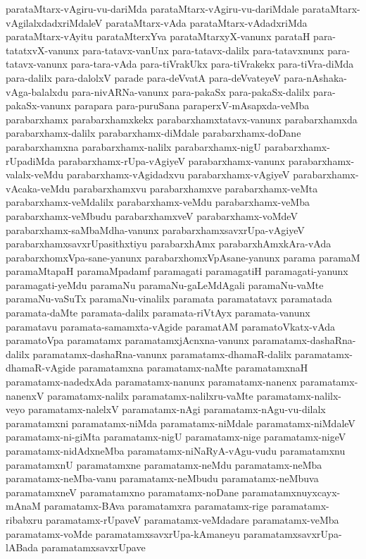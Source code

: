 {parataMtarx-vAgiru-vu-dariMda
parataMtarx-vAgiru-vu-dariMdale
parataMtarx-vAgilalxdadxriMdaleV
parataMtarx-vAda
parataMtarx-vAdadxriMda
parataMtarx-vAyitu
parataMterxYva
parataMtarxyX-vanunx
parataH
para-tatatxvX-vanunx
para-tatavx-vanUnx
para-tatavx-dalilx
para-tatavxnunx
para-tatavx-vanunx
para-tara-vAda
para-tiVrakUkx
para-tiVrakekx
para-tiVra-diMda
para-dalilx
para-dalolxV
parade
para-deVvatA
para-deVvateyeV
para-nAshaka-vAga-balalxdu
para-nivARNa-vanunx
para-pakaSx
para-pakaSx-dalilx
para-pakaSx-vanunx
parapara
para-puruSana
paraperxV-mAsapxda-veMba
parabarxhamx
parabarxhamxkekx
parabarxhamxtatavx-vanunx
parabarxhamxda
parabarxhamx-dalilx
parabarxhamx-diMdale
parabarxhamx-doDane
parabarxhamxna
parabarxhamx-nalilx
parabarxhamx-nigU
parabarxhamx-rUpadiMda
parabarxhamx-rUpa-vAgiyeV
parabarxhamx-vanunx
parabarxhamx-valalx-veMdu
parabarxhamx-vAgidadxvu
parabarxhamx-vAgiyeV
parabarxhamx-vAcaka-veMdu
parabarxhamxvu
parabarxhamxve
parabarxhamx-veMta
parabarxhamx-veMdalilx
parabarxhamx-veMdu
parabarxhamx-veMba
parabarxhamx-veMbudu
parabarxhamxveV
parabarxhamx-voMdeV
parabarxhamx-saMbaMdha-vanunx
parabarxhamxsavxrUpa-vAgiyeV
parabarxhamxsavxrUpasithxtiyu
parabarxhAmx
parabarxhAmxkAra-vAda
parabarxhomxVpa-sane-yanunx
parabarxhomxVpAsane-yanunx
parama
paramaM
paramaMtapaH
paramaMpadamf
paramagati
paramagatiH
paramagati-yanunx
paramagati-yeMdu
paramaNu
paramaNu-gaLeMdAgali
paramaNu-vaMte
paramaNu-vaSuTx
paramaNu-vinalilx
paramata
paramatatavx
paramatada
paramata-daMte
paramata-dalilx
paramata-riVtAyx
paramata-vanunx
paramatavu
paramata-samamxta-vAgide
paramatAM
paramatoVkatx-vAda
paramatoVpa
paramatamx
paramatamxjAcnxna-vanunx
paramatamx-dashaRna-dalilx
paramatamx-dashaRna-vanunx
paramatamx-dhamaR-dalilx
paramatamx-dhamaR-vAgide
paramatamxna
paramatamx-naMte
paramatamxnaH
paramatamx-nadedxAda
paramatamx-nanunx
paramatamx-nanenx
paramatamx-nanenxV
paramatamx-nalilx
paramatamx-nalilxru-vaMte
paramatamx-nalilx-veyo
paramatamx-nalelxV
paramatamx-nAgi
paramatamx-nAgu-vu-dilalx
paramatamxni
paramatamx-niMda
paramatamx-niMdale
paramatamx-niMdaleV
paramatamx-ni-giMta
paramatamx-nigU
paramatamx-nige
paramatamx-nigeV
paramatamx-nidAdxneMba
paramatamx-niNaRyA-vAgu-vudu
paramatamxnu
paramatamxnU
paramatamxne
paramatamx-neMdu
paramatamx-neMba
paramatamx-neMba-vanu
paramatamx-neMbudu
paramatamx-neMbuva
paramatamxneV
paramatamxno
paramatamx-noDane
paramatamxnuyxcayx-mAnaM
paramatamx-BAva
paramatamxra
paramatamx-rige
paramatamx-ribabxru
paramatamx-rUpaveV
paramatamx-veMdadare
paramatamx-veMba
paramatamx-voMde
paramatamxsavxrUpa-kAmaneyu
paramatamxsavxrUpa-lABada
paramatamxsavxrUpave
}
